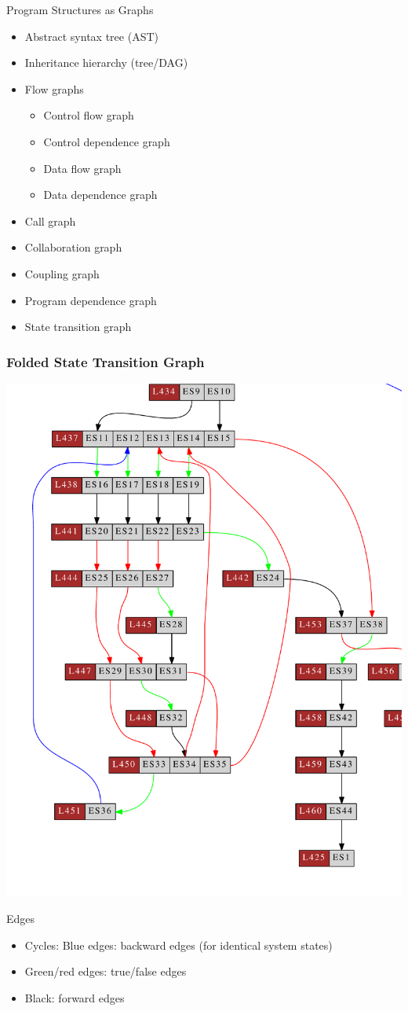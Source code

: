 \begin{frame}{Program Structures as Graphs}
\begin{itemize}
\item Abstract syntax tree (AST)
\item Inheritance hierarchy (tree/DAG)
\item Flow graphs
\begin{itemize}
\item Control flow graph
\item Control dependence graph
\item Data flow graph
\item Data dependence graph
\end{itemize}
\item Call graph
\item Collaboration graph
\item Coupling graph
\item Program dependence graph
\item State transition graph
\end{itemize}
\end{frame}

\begin{frame}[fragile]
\frametitle{Folded State Transition Graph}

\includegraphics[width=0.4\columnwidth]{../manual/gfx/basictest10f_transitiongraph2}

\vspace{-0.3cm}
{
\scriptsize
\begin{block}{Edges}
\begin{itemize}
\item Cycles: Blue edges: backward edges (for identical system states)
\item Green/red edges: true/false edges
\item Black: forward edges
\end{itemize}
\end{block}
}

\end{frame}


